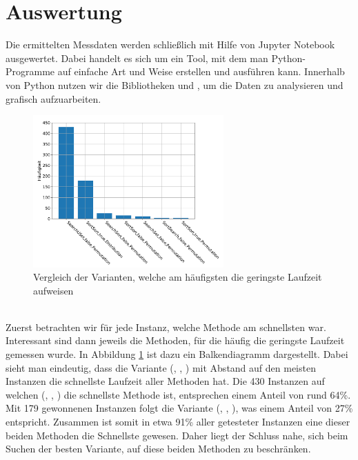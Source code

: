 
\section{Auswertung}
\label{ref:auswertung}
Die ermittelten Messdaten werden schließlich mit Hilfe von 
Jupyter Notebook \cite{jupyter} ausgewertet. Dabei
handelt es sich um ein Tool, mit dem man Python-Programme auf einfache Art und Weise erstellen und 
ausführen kann.
Innerhalb von Python nutzen wir die Bibliotheken  und , um die Daten
zu analysieren und grafisch aufzuarbeiten.
\begin{figure}
\centering
	\includegraphics[width = 0.65\textwidth]{figures/counting.pdf}
	\caption{Vergleich der Varianten, welche am häufigsten die geringste Laufzeit aufweisen}
	\label{fig:messung_counting}
\end{figure}
\\

Zuerst betrachten wir für jede Instanz, welche Methode am schnellsten war.
Interessant sind dann jeweils die Methoden, für die häufig die geringste Laufzeit gemessen wurde.
In Abbildung \ref{fig:messung_counting} ist dazu ein Balkendiagramm dargestellt.
Dabei sieht man eindeutig, dass die Variante (\SeaUSet, \false, \perm) mit Abstand 
auf den meisten Instanzen die schnellste Laufzeit aller Methoden hat. Die
430 Instanzen auf welchen (\SeaUSet, \false, \perm) die schnellste Methode ist, entsprechen einem Anteil von rund
64\%. Mit 179 \glqq gewonnenen\grqq{} Instanzen folgt die Variante (\SorSor, \true, \distr), was einem Anteil von
27\% entspricht. Zusammen ist somit in etwa 91\% aller getesteter Instanzen eine dieser beiden Methoden
die Schnellste gewesen. Daher liegt der Schluss nahe, sich beim Suchen der \glqq besten\grqq{} Variante,
auf diese beiden Methoden zu beschränken. 
\\

